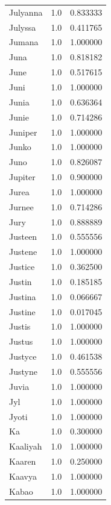 \documentclass[
  letterpaper,
  DIV=11,
  numbers=noendperiod]{scrreprt}
\begin{document}
\begin{tabular}{lrr}
Julyanna        &   1.0 &   0.833333 \\
Julyssa         &   1.0 &   0.411765 \\
Jumana          &   1.0 &   1.000000 \\
Juna            &   1.0 &   0.818182 \\
June            &   1.0 &   0.517615 \\
Juni            &   1.0 &   1.000000 \\
Junia           &   1.0 &   0.636364 \\
Junie           &   1.0 &   0.714286 \\
Juniper         &   1.0 &   1.000000 \\
Junko           &   1.0 &   1.000000 \\
Juno            &   1.0 &   0.826087 \\
Jupiter         &   1.0 &   0.900000 \\
Jurea           &   1.0 &   1.000000 \\
Jurnee          &   1.0 &   0.714286 \\
Jury            &   1.0 &   0.888889 \\
Justeen         &   1.0 &   0.555556 \\
Justene         &   1.0 &   1.000000 \\
Justice         &   1.0 &   0.362500 \\
Justin          &   1.0 &   0.185185 \\
Justina         &   1.0 &   0.066667 \\
Justine         &   1.0 &   0.017045 \\
Justis          &   1.0 &   1.000000 \\
Justus          &   1.0 &   1.000000 \\
Justyce         &   1.0 &   0.461538 \\
Justyne         &   1.0 &   0.555556 \\
Juvia           &   1.0 &   1.000000 \\
Jyl             &   1.0 &   1.000000 \\
Jyoti           &   1.0 &   1.000000 \\
Ka              &   1.0 &   0.300000 \\
Kaaliyah        &   1.0 &   1.000000 \\
Kaaren          &   1.0 &   0.250000 \\
Kaavya          &   1.0 &   1.000000 \\
Kabao           &   1.0 &   1.000000 \\

\end{tabular}
\end{document}
